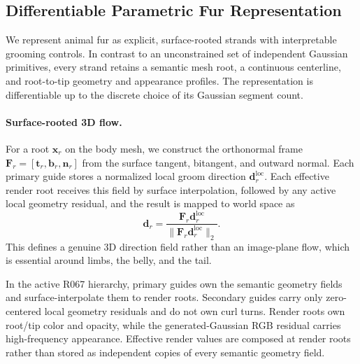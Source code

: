 \subsection{Differentiable Parametric Fur Representation}
\label{sec:parametric-fur}

We represent animal fur as explicit, surface-rooted strands with interpretable
grooming controls. In contrast to an unconstrained set of independent Gaussian
primitives, every strand retains a semantic mesh root, a continuous centerline,
and root-to-tip geometry and appearance profiles. The representation is
differentiable up to the discrete choice of its Gaussian segment count.

\paragraph{Surface-rooted 3D flow.}
For a root $\mathbf{x}_r$ on the body mesh, we construct the orthonormal frame
$\mathbf{F}_r=[\mathbf{t}_r,\mathbf{b}_r,\mathbf{n}_r]$ from the surface
tangent, bitangent, and outward normal. Each primary guide stores a normalized
local groom direction $\mathbf{d}^{\mathrm{loc}}_r$. Each effective render root
receives this field by surface interpolation, followed by any active local
geometry residual, and the result is mapped to world space as
\begin{equation}
    \mathbf{d}_r =
    \frac{\mathbf{F}_r\mathbf{d}^{\mathrm{loc}}_r}
         {\lVert\mathbf{F}_r\mathbf{d}^{\mathrm{loc}}_r\rVert_2}.
\end{equation}
This defines a genuine 3D direction field rather than an image-plane flow,
which is essential around limbs, the belly, and the tail.

In the active R067 hierarchy, primary guides own the semantic geometry fields
and surface-interpolate them to render roots. Secondary guides carry only
zero-centered local geometry residuals and do not own curl turns. Render roots
own root/tip color and opacity, while the generated-Gaussian RGB residual
carries high-frequency appearance. Effective render values are composed at
render roots rather than stored as independent copies of every semantic
geometry field.

